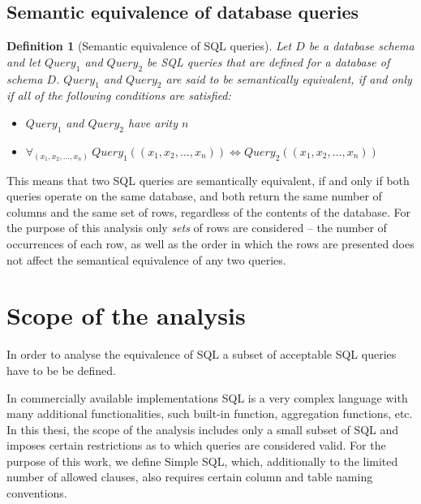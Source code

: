 \documentclass[magisterska,en]{pracamgr}
\newtheorem{defi}{Definition}[section]
\begin{document}
\section{Semantic equivalence of database queries}

\begin{defi}[Semantic equivalence of SQL queries]
Let $D$ be a database schema and let $Query_1$ and $Query_2$ be SQL queries that are defined for a database of schema $D$. $Query_1$ and $Query_2$ are said to be \emph{semantically equivalent}, if and only if all of the following conditions are satisfied:
\begin{itemize}
    \item $Query_1$ and $Query_2$ have arity $n$
    \item $\forall_{(x_1, x_2, \dots, x_n)}\ Query_1((x_1, x_2, \dots, x_n)) \iff Query_2((x_1, x_2, \dots, x_n))$
\end{itemize}
\end{defi}

This means that two SQL queries are semantically equivalent, if and only if both queries operate on the same database, and both return the same number of columns and the same set of rows, regardless of the contents of the database. For the purpose of this analysis only \emph{sets} of rows are considered -- the number of occurrences of each row, as well as the order in which the rows are presented does not affect the semantical equivalence of any two queries.


























\chapter{Scope of the analysis}
In order to analyse the equivalence of SQL a subset of acceptable SQL queries have to be be defined.

In commercially available implementations SQL is a very complex language with many additional functionalities, such built-in function, aggregation functions, etc. In this thesi, the scope of the analysis includes only a small subset of SQL and imposes certain restrictions as to which queries are considered valid. For the purpose of this work, we define Simple SQL, which, additionally to the limited number of allowed clauses, also requires certain column and table naming conventions.
\end{document}
